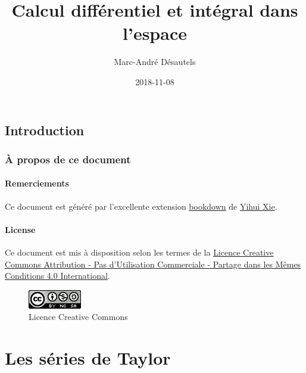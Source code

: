 \documentclass[]{book}
\title{Calcul différentiel et intégral dans l'espace}
\author{Marc-André Désautels}
\date{2018-11-08}
\theoremstyle{definition}
\theoremstyle{definition}
\theoremstyle{definition}
\theoremstyle{remark}
\begin{document}
\maketitle

{
\setcounter{tocdepth}{2}
\tableofcontents
}
\hypertarget{introduction}{%
\chapter*{Introduction}\label{introduction}}

\hypertarget{a-propos-de-ce-document}{%
\section*{À propos de ce document}\label{a-propos-de-ce-document}}

\hypertarget{remerciements}{%
\subsection*{Remerciements}\label{remerciements}}

Ce document est généré par l'excellente extension
\href{https://bookdown.org/}{bookdown} de
\href{https://yihui.name/}{Yihui Xie}.

\hypertarget{license}{%
\subsection*{License}\label{license}}

Ce document est mis à disposition selon les termes de la
\href{http://creativecommons.org/licenses/by-nc-sa/4.0/}{Licence
Creative Commons Attribution - Pas d'Utilisation Commerciale - Partage
dans les Mêmes Conditions 4.0 International}.

\begin{figure}
\centering
\includegraphics{resources/icons/license_cc.png}
\caption{Licence Creative Commons}
\end{figure}

\hypertarget{part-les-series-de-taylor}{%
\part{Les séries de Taylor}\label{part-les-series-de-taylor}}
\end{document}
